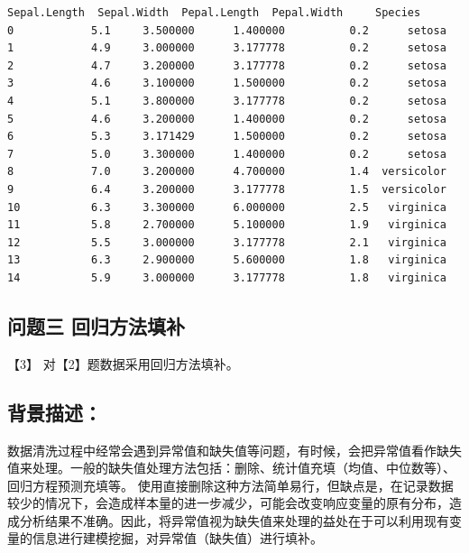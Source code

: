 \documentclass[11pt]{article}
\makeatletter
\newcommand{\boxspacing}{\kern\kvtcb@left@rule\kern\kvtcb@boxsep}
\newcommand{\prompt}[4]{
        \ttfamily\llap{{\color{#2}[#3]:\hspace{3pt}#4}}\vspace{-\baselineskip}
    }
\makeatother
\begin{document}
            \begin{tcolorbox}[breakable, size=fbox, boxrule=.5pt, pad at break*=1mm, opacityfill=0]
\prompt{Out}{outcolor}{384}{\boxspacing}
\begin{Verbatim}[commandchars=\\\{\}]
    Sepal.Length  Sepal.Width  Pepal.Length  Pepal.Width     Species
0            5.1     3.500000      1.400000          0.2      setosa
1            4.9     3.000000      3.177778          0.2      setosa
2            4.7     3.200000      3.177778          0.2      setosa
3            4.6     3.100000      1.500000          0.2      setosa
4            5.1     3.800000      3.177778          0.2      setosa
5            4.6     3.200000      1.400000          0.2      setosa
6            5.3     3.171429      1.500000          0.2      setosa
7            5.0     3.300000      1.400000          0.2      setosa
8            7.0     3.200000      4.700000          1.4  versicolor
9            6.4     3.200000      3.177778          1.5  versicolor
10           6.3     3.300000      6.000000          2.5   virginica
11           5.8     2.700000      5.100000          1.9   virginica
12           5.5     3.000000      3.177778          2.1   virginica
13           6.3     2.900000      5.600000          1.8   virginica
14           5.9     3.000000      3.177778          1.8   virginica
\end{Verbatim}
\end{tcolorbox}
        
    \hypertarget{ux95eeux9898ux4e09-ux56deux5f52ux65b9ux6cd5ux586bux8865}{%
\subsection{问题三
回归方法填补}\label{ux95eeux9898ux4e09-ux56deux5f52ux65b9ux6cd5ux586bux8865}}

    【3】 对【2】题数据采用回归方法填补。

    \hypertarget{ux80ccux666fux63cfux8ff0}{%
\subsection{背景描述：}\label{ux80ccux666fux63cfux8ff0}}

数据清洗过程中经常会遇到异常值和缺失值等问题，有时候，会把异常值看作缺失值来处理。一般的缺失值处理方法包括：删除、统计值充填（均值、中位数等）、回归方程预测充填等。
使用直接删除这种方法简单易行，但缺点是，在记录数据较少的情况下，会造成样本量的进一步减少，可能会改变响应变量的原有分布，造成分析结果不准确。因此，将异常值视为缺失值来处理的益处在于可以利用现有变量的信息进行建模挖掘，对异常值（缺失值）进行填补。
\end{document}
